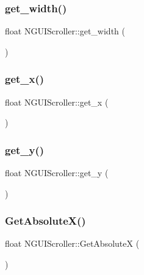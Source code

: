 \subsubsection{\texorpdfstring{get\+\_\+width()}{get\_width()}}
{\footnotesize\ttfamily float N\+G\+U\+I\+Scroller\+::get\+\_\+width (\begin{DoxyParamCaption}{ }\end{DoxyParamCaption})}

\hypertarget{class_n_g_u_i_scroller_a770d46565143c5f953a8d845d79c5959}{}\label{class_n_g_u_i_scroller_a770d46565143c5f953a8d845d79c5959} 
\subsubsection{\texorpdfstring{get\+\_\+x()}{get\_x()}}
{\footnotesize\ttfamily float N\+G\+U\+I\+Scroller\+::get\+\_\+x (\begin{DoxyParamCaption}{ }\end{DoxyParamCaption})}

\hypertarget{class_n_g_u_i_scroller_a5f4a49eb53b407c48f74d71fe50c3c41}{}\label{class_n_g_u_i_scroller_a5f4a49eb53b407c48f74d71fe50c3c41} 
\subsubsection{\texorpdfstring{get\+\_\+y()}{get\_y()}}
{\footnotesize\ttfamily float N\+G\+U\+I\+Scroller\+::get\+\_\+y (\begin{DoxyParamCaption}{ }\end{DoxyParamCaption})}

\hypertarget{class_n_g_u_i_scroller_aee68fffe9c4ce421cccdbb077122f5ce}{}\label{class_n_g_u_i_scroller_aee68fffe9c4ce421cccdbb077122f5ce} 
\subsubsection{\texorpdfstring{Get\+Absolute\+X()}{GetAbsoluteX()}}
{\footnotesize\ttfamily float N\+G\+U\+I\+Scroller\+::\+Get\+AbsoluteX (\begin{DoxyParamCaption}{ }\end{DoxyParamCaption})}

